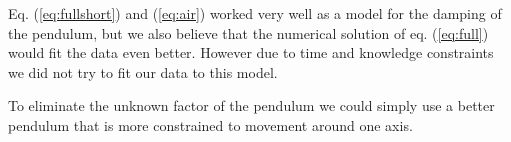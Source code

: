 Eq. (\ref{eq:fullshort}) and (\ref{eq:air}) worked very well as a model for the damping of the pendulum, but we also believe that the numerical solution of eq. (\ref{eq:full}) would fit the data even better. However due to time and knowledge constraints we did not try to fit our data to this model.

To eliminate the unknown factor of the pendulum we could simply use a better pendulum that is more
constrained to movement around one axis. 